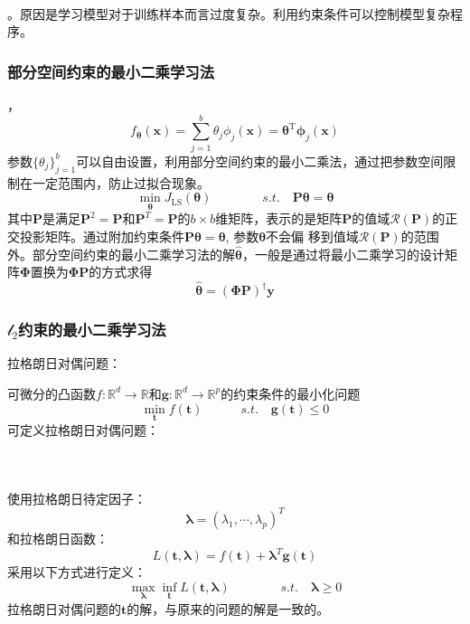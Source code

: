 \documentclass{beamer}
\newcommand{\Tau}{\mathrm{T}}
\newcommand{\tmmathbf}[1]{\ensuremath{\boldsymbol{#1}}}
\newcommand{\tmop}[1]{\ensuremath{\operatorname{#1}}}
\begin{document}
\begin{CJK*}{UTF8}{gbsn}
{{\begin{frame}
  \
  
  。原因是学习模型对于训练样本而言过度复杂。利用约束条件可以控制模型复杂程序。
\end{frame}}{\begin{frame}
  \frametitle{部分空间约束的最小二乘学习法}
  
  ，
  \[ f_{\tmmathbf{\theta}} (\tmmathbf{x}) = \sum_{j = 1}^b \theta_j \phi_j
     (\tmmathbf{x}) =\tmmathbf{\theta}^{\Tau} \tmmathbf{\phi}_j (\tmmathbf{x})
  \]
  参数$\{ \theta_j \}_{j =
  1}^b$可以自由设置，利用部分空间约束的最小二乘法，通过把参数空间限制在一定范围内，防止过拟合现象。
  \[ \min_{\tmmathbf{\theta}} J_{\tmop{LS}} (\tmmathbf{\theta}) \hspace{4em}
     s.t. \quad \tmmathbf{P}\tmmathbf{\theta}=\tmmathbf{\theta} \]
  其中$\tmmathbf{P}$是满足$\tmmathbf{P}^2
  =\tmmathbf{P}$和$\tmmathbf{P}^T =\tmmathbf{P}$的$b \times
  b$维矩阵，表示的是矩阵$\tmmathbf{P}$的值域$\mathcal{R}
  (\tmmathbf{P})$的正交投影矩阵。通过附加约束条件$\tmmathbf{P}\tmmathbf{\theta}=\tmmathbf{\theta}$,
  参数$\tmmathbf{\theta}$不会偏 移到值域$\mathcal{R}
  (\tmmathbf{P})$的范围外。部分空间约束的最小二乘学习法的解$\hat{\tmmathbf{\theta}}$，一般是通过将最小二乘学习的设计矩阵$\tmmathbf{\Phi}$置换为$\tmmathbf{\Phi}\tmmathbf{P}$的方式求得
  \[ \hat{\tmmathbf{\theta}} = (\tmmathbf{\Phi}\tmmathbf{P})^{\dag}
     \tmmathbf{y} \]
\end{frame}}{\begin{frame}
  \frametitle{$\mathcal{l}_2$约束的最小二乘学习法}
  
  拉格朗日对偶问题：
  
  可微分的凸函数$f : \mathbb{R}^d \rightarrow
  \mathbb{R}$和$\tmmathbf{g}: \mathbb{R}^d \rightarrow
  \mathbb{R}^p$的约束条件的最小化问题
  \[ \min_{\tmmathbf{t}} f (\tmmathbf{t}) \hspace{3em} s.t. \quad \tmmathbf{g}
     (\tmmathbf{t}) \leqslant 0 \]
  可定义拉格朗日对偶问题：
  
  \ 
\end{frame}}{\begin{frame}
  \frametitle{}
  
  使用拉格朗日待定因子：
  \[ \tmmathbf{\lambda}= (\lambda_1, \cdots, \lambda_p)^T  \]
  和拉格朗日函数：
  \[ L (\tmmathbf{t}, \tmmathbf{\lambda}) = f (\tmmathbf{t})
     +\tmmathbf{\lambda}^T \tmmathbf{g} (\tmmathbf{t}) \]
  采用以下方式进行定义：
  \[ \max_{\tmmathbf{\lambda}} \inf_{\tmmathbf{t}} L (\tmmathbf{t},
     \tmmathbf{\lambda}) \hspace{4em} s.t. \quad \tmmathbf{\lambda} \geqslant
     0 \]
  拉格朗日对偶问题的$\tmmathbf{t}$的解，与原来的问题的解是一致的。
\end{frame}}{\begin{frame}
  \frametitle{}
  

\end{frame}}}
\end{CJK*}
\end{document}
